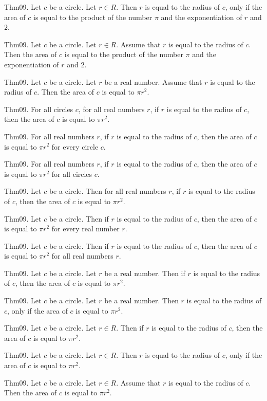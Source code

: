 \documentclass{article}
\begin{document}
Thm09. Let $c$ be a circle. Let $r \in R$. Then $r$ is equal to the radius of $c$, only if the area of $c$ is equal to the product of the number \(\pi\) and the exponentiation of $r$ and $2$.

Thm09. Let $c$ be a circle. Let $r \in R$. Assume that $r$ is equal to the radius of $c$. Then the area of $c$ is equal to the product of the number \(\pi\) and the exponentiation of $r$ and $2$.

Thm09. Let $c$ be a circle. Let $r$ be a real number. Assume that $r$ is equal to the radius of $c$. Then the area of $c$ is equal to $\pi r ^ {2}$.

Thm09. For all circles $c$, for all real numbers $r$, if $r$ is equal to the radius of $c$, then the area of $c$ is equal to $\pi r ^ {2}$.

Thm09. For all real numbers $r$, if $r$ is equal to the radius of $c$, then the area of $c$ is equal to $\pi r ^ {2}$ for every circle $c$.

Thm09. For all real numbers $r$, if $r$ is equal to the radius of $c$, then the area of $c$ is equal to $\pi r ^ {2}$ for all circles $c$.

Thm09. Let $c$ be a circle. Then for all real numbers $r$, if $r$ is equal to the radius of $c$, then the area of $c$ is equal to $\pi r ^ {2}$.

Thm09. Let $c$ be a circle. Then if $r$ is equal to the radius of $c$, then the area of $c$ is equal to $\pi r ^ {2}$ for every real number $r$.

Thm09. Let $c$ be a circle. Then if $r$ is equal to the radius of $c$, then the area of $c$ is equal to $\pi r ^ {2}$ for all real numbers $r$.

Thm09. Let $c$ be a circle. Let $r$ be a real number. Then if $r$ is equal to the radius of $c$, then the area of $c$ is equal to $\pi r ^ {2}$.

Thm09. Let $c$ be a circle. Let $r$ be a real number. Then $r$ is equal to the radius of $c$, only if the area of $c$ is equal to $\pi r ^ {2}$.

Thm09. Let $c$ be a circle. Let $r \in R$. Then if $r$ is equal to the radius of $c$, then the area of $c$ is equal to $\pi r ^ {2}$.

Thm09. Let $c$ be a circle. Let $r \in R$. Then $r$ is equal to the radius of $c$, only if the area of $c$ is equal to $\pi r ^ {2}$.

Thm09. Let $c$ be a circle. Let $r \in R$. Assume that $r$ is equal to the radius of $c$. Then the area of $c$ is equal to $\pi r ^ {2}$.
\end{document}

